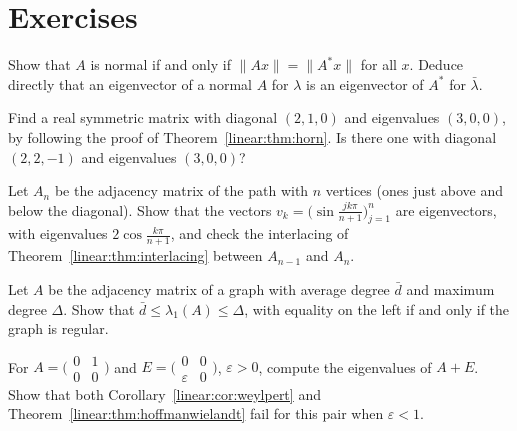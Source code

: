 \section{Exercises}

\begin{exercise}[$\star$]\label{linear:ex:normaliff}
Show that $A$ is normal if and only if $\|Ax\|=\|A^*x\|$ for all $x$. Deduce directly that an eigenvector of a normal $A$
for $\lambda$ is an eigenvector of $A^*$ for $\bar\lambda$.
\end{exercise}

\begin{exercise}[$\star$]\label{linear:ex:hornsmall}
Find a real symmetric matrix with diagonal $(2,1,0)$ and eigenvalues $(3,0,0)$, by following the proof of
Theorem~\ref{linear:thm:horn}. Is there one with diagonal $(2,2,-1)$ and eigenvalues $(3,0,0)$?
\end{exercise}

\begin{exercise}[$\star$]\label{linear:ex:pathgraph}
Let $A_n$ be the adjacency matrix of the path with $n$ vertices (ones just above and below the diagonal). Show that the
vectors $v_k=\bigl(\sin\frac{jk\pi}{n+1}\bigr)_{j=1}^n$ are eigenvectors, with eigenvalues $2\cos\frac{k\pi}{n+1}$, and check
the interlacing of Theorem~\ref{linear:thm:interlacing} between $A_{n-1}$ and $A_n$.
\end{exercise}

\begin{exercise}[$\star\star$]\label{linear:ex:degree}
Let $A$ be the adjacency matrix of a graph with average degree $\bar d$ and maximum degree $\Delta$. Show that $\bar d\le
\lambda_1(A)\le\Delta$, with equality on the left if and only if the graph is regular.
\end{exercise}

\begin{exercise}[$\star$]\label{linear:ex:nonnormal}
For $A=\bigl(\begin{smallmatrix}0&1\\0&0\end{smallmatrix}\bigr)$ and $E=\bigl(\begin{smallmatrix}0&0\\\varepsilon&0
\end{smallmatrix}\bigr)$, $\varepsilon>0$, compute the eigenvalues of $A+E$. Show that both Corollary~\ref{linear:cor:weylpert} and
Theorem~\ref{linear:thm:hoffmanwielandt} fail for this pair when $\varepsilon<1$.
\end{exercise}

